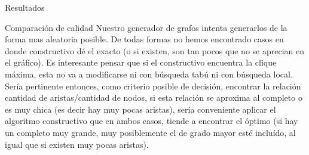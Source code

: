 \documentclass[12pt,titlepage]{article}
\begin{document}
\begin{section}{Resultados}
\begin{subsection}{Comparación de calidad}
		Nuestro generador de grafos intenta generarlos de la forma mas aleatoria posible. De todas formas no hemos encontrado casos en donde constructivo dé el exacto (o si existen, son tan pocos que no se aprecian en el gráfico). Es interesante pensar que si el constructivo encuentra la clique máxima, esta no va a modificarse ni con búsqueda tabú ni con búsqueda local. Sería pertinente entonces, como criterio posible de decisión, encontrar la relación cantidad de aristas/cantidad de nodos, si esta relación se aproxima al completo o es muy chica (es decir hay muy pocas aristas), sería conveniente aplicar el algoritmo constructivo que en ambos casos, tiende a encontrar el óptimo (si hay un completo muy grande, muy posiblemente el de grado mayor esté incluído, al igual que si existen muy pocas aristas).
		\end{subsection}
	\end{section}
\end{document}

